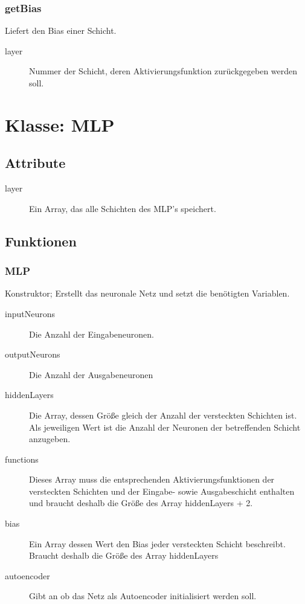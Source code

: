 \documentclass[a4paper,10pt]{scrartcl}
\begin{document}
\subsubsection{getBias}
Liefert den Bias einer Schicht.
\begin{description}
\item[layer] Nummer der Schicht, deren Aktivierungsfunktion zurückgegeben werden soll.
\end{description}



\section{Klasse: MLP}
\subsection{Attribute}
\begin{description}
 \item[layer] Ein Array, das alle Schichten des MLP's speichert.
\end{description}

\subsection{Funktionen}
\subsubsection{MLP}
Konstruktor; Erstellt das neuronale Netz und setzt die benötigten Variablen.
\begin{description}
\item[inputNeurons] Die Anzahl der Eingabeneuronen.
\item[outputNeurons] Die Anzahl der Ausgabeneuronen
\item[hiddenLayers] Die Array, dessen Größe gleich der Anzahl der versteckten Schichten ist. Als jeweiligen Wert ist die Anzahl der Neuronen
 der betreffenden Schicht anzugeben.
 \item[functions] Dieses Array muss die entsprechenden Aktivierungsfunktionen der versteckten Schichten und der Eingabe- sowie
 Ausgabeschicht enthalten und braucht deshalb die Größe des Array hiddenLayers + 2.
 \item[bias] Ein Array dessen Wert den Bias jeder versteckten Schicht beschreibt. Braucht deshalb die Größe des Array hiddenLayers
 \item[autoencoder] Gibt an ob das Netz als Autoencoder initialisiert werden soll.
\end{description}
\end{document}
